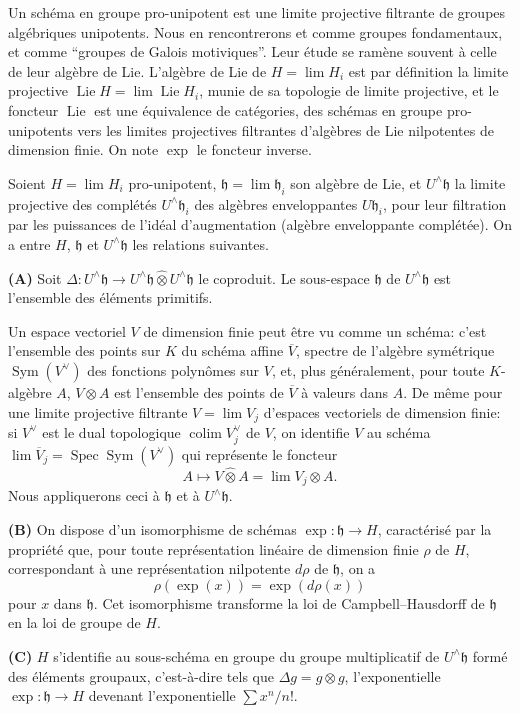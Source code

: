 \documentclass[10pt,a4paper]{article}
\newcommand{\Spec}{\operatorname{Spec}}
\newcommand{\Sym}{\operatorname{Sym}}
\newcommand{\Lie}{\operatorname{Lie}}
\newcommand{\h}{\mathfrak h}
\newcommand{\widehattensor}{\mathbin{\widehat\otimes}}
\newcommand{\Uhat}{U^{\wedge}}
\newcommand{\colim}{\operatorname*{colim}}
\theoremstyle{deligne}
\newcommand{\heading}[1]{\vspace{0.65em}\noindent{\bfseries #1}\quad}
\begin{document}
\heading{1.1.} Un schéma en groupe pro-unipotent est une limite projective filtrante de groupes algébriques unipotents. Nous en rencontrerons et comme groupes fondamentaux, et comme ``groupes de Galois motiviques''. Leur étude se ramène souvent à celle de leur algèbre de Lie. L'algèbre de Lie de \(H=\lim H_i\) est par définition la limite projective \(\Lie H=\lim \Lie H_i\), munie de sa topologie de limite projective, et le foncteur \(\Lie\) est une équivalence de catégories, des schémas en groupe pro-unipotents vers les limites projectives filtrantes d'algèbres de Lie nilpotentes de dimension finie. On note \(\exp\) le foncteur inverse.

\heading{1.2 (cf. [1] A.1 à A.9).} Soient \(H=\lim H_i\) pro-unipotent, \(\h=\lim \h_i\) son algèbre de Lie, et \(\Uhat\h\) la limite projective des complétés \(\Uhat\h_i\) des algèbres enveloppantes \(U\h_i\), pour leur filtration par les puissances de l'idéal d'augmentation (algèbre enveloppante complétée). On a entre \(H\), \(\h\) et \(\Uhat\h\) les relations suivantes.

\textbf{(A)} Soit \(\Delta:\Uhat\h\to \Uhat\h\widehattensor\Uhat\h\) le coproduit. Le sous-espace \(\h\) de \(\Uhat\h\) est l'ensemble des éléments primitifs.

Un espace vectoriel \(V\) de dimension finie peut être vu comme un schéma: c'est l'ensemble des points sur \(K\) du schéma affine \(\overline V\), spectre de l'algèbre symétrique \(\Sym(V^\vee)\) des fonctions polynômes sur \(V\), et, plus généralement, pour toute \(K\)-algèbre \(A\), \(V\otimes A\) est l'ensemble des points de \(\overline V\) à valeurs dans \(A\). De même pour une limite projective filtrante \(V=\lim V_j\) d'espaces vectoriels de dimension finie: si \(V^\vee\) est le dual topologique \(\colim V_j^\vee\) de \(V\), on identifie \(V\) au schéma \(\lim \overline V_j=\Spec\Sym(V^\vee)\) qui représente le foncteur
\[
A\longmapsto V\widehattensor A=\lim V_j\otimes A.
\]
Nous appliquerons ceci à \(\h\) et à \(\Uhat\h\).

\textbf{(B)} On dispose d'un isomorphisme de schémas \(\exp:\h\to H\), caractérisé par la propriété que, pour toute représentation linéaire de dimension finie \(\rho\) de \(H\), correspondant à une représentation nilpotente \(d\rho\) de \(\h\), on a
\[
\rho(\exp(x))=\exp(d\rho(x))
\]
pour \(x\) dans \(\h\). Cet isomorphisme transforme la loi de Campbell--Hausdorff de \(\h\) en la loi de groupe de \(H\).

\textbf{(C)} \(H\) s'identifie au sous-schéma en groupe du groupe multiplicatif de \(\Uhat\h\) formé des éléments groupaux, c'est-à-dire tels que \(\Delta g=g\otimes g\), l'exponentielle \(\exp:\h\to H\) devenant l'exponentielle \(\sum x^n/n!\).
\end{document}
